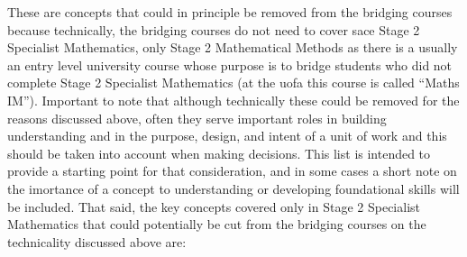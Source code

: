 \documentclass[twoside,12pt,a4paper]{report}
\begin{document}
These are concepts that could in principle be removed from the bridging courses because technically, the bridging courses do not need to cover \gls{sace} Stage 2 Specialist Mathematics, only Stage 2 Mathematical Methods as there is a usually an entry level university course whose purpose is to bridge students who did not complete Stage 2 Specialist Mathematics (at the \gls{uofa} this course is called ``Maths IM''). Important to note that although technically these could be removed for the reasons discussed above, often they serve important roles in building understanding and in the purpose, design, and intent of a unit of work and this should be taken into account when making decisions. This list is intended to provide a starting point for that consideration, and in some cases a short note on the imortance of a concept to understanding or developing foundational skills will be included. That said, the key concepts covered only in Stage 2 Specialist Mathematics that could potentially be cut from the bridging courses on the technicality discussed above are:
\end{document}
